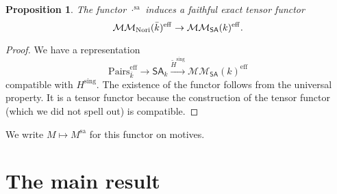 \documentclass[11pt,a4paper]{amsart}
\newtheorem{prop}[lemma]{Proposition}
\theoremstyle{definition}
\newcommand{\MMN}{\mathcal{MM}_{\rm Nori}}
\newcommand{\MMSA}{\mathcal{MM}_{\SA}}
\newcommand{\Ch}{\mathcal{C}}
\newcommand{\tensor}{\otimes}
\newcommand{\eff}{\mathrm{eff}}
\newcommand{\sa}{\mathrm{sa}}
\newcommand{\sing}{\mathrm{sing}}
\newcommand{\Hsing}{H^\sing}
\newcommand{\Hsingtilde}{\tilde{H}^\sing}
\newcommand{\pairs}{\mathrm{Pairs}}
\newcommand{\SA}{\mathsf{SA}}
\newcommand{\GSA}{\mathsf{GSA}}
\newcommand{\pairseff}{\pairs^\eff}
\newcommand{\good}{\mathrm{Good}}
\newcommand{\goodeff}{\good^\eff}
\begin{document}
\begin{prop}
The functor $\cdot^\sa$ induces a faithful exact tensor functor
\[ \MMN(\bar{k})^\eff\to\MMSA(k)^\eff.\]
\end{prop}
\begin{proof}
We have a representation 
\[ \pairs^\eff_{\bar{k}}\to \SA_k\xrightarrow{\Hsingtilde}\MMSA(k)^\eff\]
compatible with $\Hsing$.
The existence of the functor follows from the universal property. 
It is a tensor functor because the construction of the tensor functor (which we did not spell out) is compatible.
\end{proof}

We write $M\mapsto M^\sa$ for this functor on motives.

\section{The main result}
\end{document}
